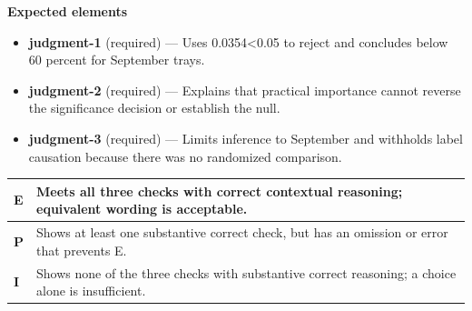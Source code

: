 \documentclass[11pt]{article}
\begin{document}

\textbf{Expected elements}
\begin{itemize}[leftmargin=1.5em,itemsep=2pt,topsep=2pt]
  \item \textbf{judgment-1} (required) --- Uses 0.0354<0.05 to reject and concludes below 60 percent for September trays.
  \item \textbf{judgment-2} (required) --- Explains that practical importance cannot reverse the significance decision or establish the null.
  \item \textbf{judgment-3} (required) --- Limits inference to September and withholds label causation because there was no randomized comparison.
\end{itemize}

{\small\renewcommand{\arraystretch}{1.25}
\noindent\begin{tabular}{|p{0.5in}|p{5.9in}|}
\hline
\textbf{E} & Meets all three checks with correct contextual reasoning; equivalent wording is acceptable. \\ \hline
\textbf{P} & Shows at least one substantive correct check, but has an omission or error that prevents E. \\ \hline
\textbf{I} & Shows none of the three checks with substantive correct reasoning; a choice alone is insufficient. \\ \hline
\end{tabular}}

\clearpage
{}
\end{document}
